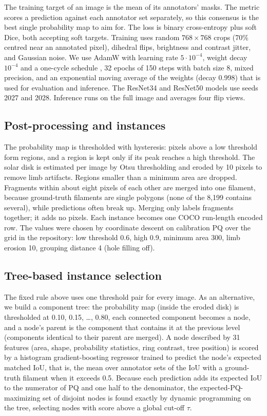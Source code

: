 \documentclass[sigconf]{acmart}
\begin{document}
The training target of an image is the mean of its annotators' masks. The metric scores a prediction against each annotator set separately, so this consensus is the best single probability map to aim for. The loss is binary cross-entropy plus soft Dice, both accepting soft targets. Training uses random $768\times768$ crops (70\% centred near an annotated pixel), dihedral flips, brightness and contrast jitter, and Gaussian noise. We use AdamW \cite{loshchilov2019adamw} with learning rate $5\cdot10^{-4}$, weight decay $10^{-4}$ and a one-cycle schedule \cite{smith2019onecycle}, 32 epochs of 150 steps with batch size 8, mixed precision, and an exponential moving average of the weights (decay 0.998) that is used for evaluation and inference. The ResNet34 and ResNet50 models use seeds 2027 and 2028. Inference runs on the full image and averages four flip views.

\subsection{Post-processing and instances}\label{sec:post}
The probability map is thresholded with hysteresis: pixels above a low threshold form regions, and a region is kept only if its peak reaches a high threshold. The solar disk is estimated per image by Otsu thresholding and eroded by 10 pixels to remove limb artifacts. Regions smaller than a minimum area are dropped. Fragments within about eight pixels of each other are merged into one filament, because ground-truth filaments are single polygons (none of the 8,199 contains several), while predictions often break up. Merging only labels fragments together; it adds no pixels. Each instance becomes one COCO run-length encoded row. The values were chosen by coordinate descent on calibration PQ over the grid in the repository: low threshold 0.6, high 0.9, minimum area 300, limb erosion 10, grouping distance 4 (hole filling off).

\subsection{Tree-based instance selection}\label{sec:tree}
The fixed rule above uses one threshold pair for every image. As an alternative, we build a component tree: the probability map (inside the eroded disk) is thresholded at 0.10, 0.15, \dots, 0.80, each connected component becomes a node, and a node's parent is the component that contains it at the previous level (components identical to their parent are merged). A node described by 31 features (area, shape, probability statistics, ring contrast, tree position) is scored by a histogram gradient-boosting regressor \cite{scikit-learn} trained to predict the node's expected matched IoU, that is, the mean over annotator sets of the IoU with a ground-truth filament when it exceeds 0.5. Because each prediction adds its expected IoU to the numerator of PQ and one half to the denominator, the expected-PQ-maximizing set of disjoint nodes is found exactly by dynamic programming on the tree, selecting nodes with score above a global cut-off $\tau$.
\end{document}
